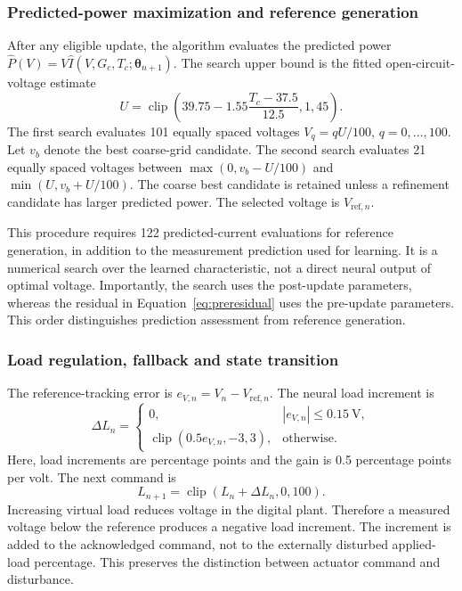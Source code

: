 \documentclass[Acad.Energy.,researcharticle,9pt,twoside,oneauthor]{Definitions/jams_academia}
\begin{document}
\subsubsection{Predicted-power maximization and reference generation}
After any eligible update, the algorithm evaluates the predicted power $\widehat P(V)=V\widehat I(V,G_c,T_c;\symbf{\theta}_{n+1})$. The search upper bound is the fitted open-circuit-voltage estimate
\begin{equation}
 U=\operatorname{clip}\left(39.75-1.55\frac{T_c-37.5}{12.5},1,45\right).
\end{equation}
The first search evaluates 101 equally spaced voltages $V_q=qU/100$, $q=0,\ldots,100$. Let $v_b$ denote the best coarse-grid candidate. The second search evaluates 21 equally spaced voltages between $\max(0,v_b-U/100)$ and $\min(U,v_b+U/100)$. The coarse best candidate is retained unless a refinement candidate has larger predicted power. The selected voltage is $V_{\mathrm{ref},n}$.

This procedure requires 122 predicted-current evaluations for reference generation, in addition to the measurement prediction used for learning. It is a numerical search over the learned characteristic, not a direct neural output of optimal voltage. Importantly, the search uses the post-update parameters, whereas the residual in Equation~\ref{eq:preresidual} uses the pre-update parameters. This order distinguishes prediction assessment from reference generation.

\subsubsection{Load regulation, fallback and state transition}
The reference-tracking error is $e_{V,n}=V_n-V_{\mathrm{ref},n}$. The neural load increment is
\begin{equation}
 \Delta L_n=\begin{cases}
 0,&|e_{V,n}|\leq0.15\ \mathrm{V},\\
 \operatorname{clip}(0.5e_{V,n},-3,3),&\text{otherwise}.
 \end{cases}
 \label{eq:loadcorrection}
\end{equation}
Here, load increments are percentage points and the gain is 0.5 percentage points per volt. The next command is
\begin{equation}
 L_{n+1}=\operatorname{clip}(L_n+\Delta L_n,0,100).
\end{equation}
Increasing virtual load reduces voltage in the digital plant. Therefore a measured voltage below the reference produces a negative load increment. The increment is added to the acknowledged command, not to the externally disturbed applied-load percentage. This preserves the distinction between actuator command and disturbance.
\end{document}
